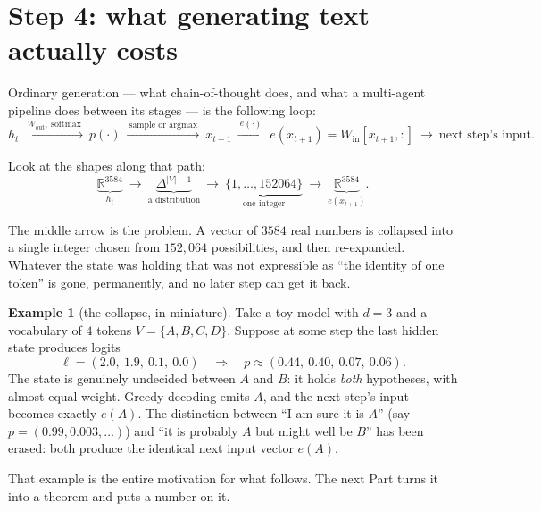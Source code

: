 \documentclass[11pt]{article}
\theoremstyle{definition}
\newtheorem{example}[theorem]{Example}
\begin{document}
\begin{center}
\end{center}

\section{Step 4: what generating text actually costs}
\label{sec:roundtrip}

Ordinary generation --- what chain-of-thought does, and what a multi-agent pipeline does between its stages --- is the following loop:
\[
h_t
\ \xrightarrow{\ W_{\mathrm{out}},\ \mathrm{softmax}\ }\ p(\cdot)
\ \xrightarrow{\ \text{sample or argmax}\ }\ x_{t+1}
\ \xrightarrow{\ e(\cdot)\ }\ e(x_{t+1}) = W_{\mathrm{in}}[x_{t+1},:]
\ \longrightarrow\ \text{next step's input}.
\tag{2.3}
\]

Look at the shapes along that path:
\[
\underbrace{\mathbb{R}^{3584}}_{h_t}
\ \longrightarrow\
\underbrace{\Delta^{|V|-1}}_{\text{a distribution}}
\ \longrightarrow\
\underbrace{\{1,\dots,152064\}}_{\text{one integer}}
\ \longrightarrow\
\underbrace{\mathbb{R}^{3584}}_{e(x_{t+1})}.
\]

The middle arrow is the problem. A vector of $3584$ real numbers is collapsed into a single integer chosen from $152{,}064$ possibilities, and then re-expanded. Whatever the state was holding that was not expressible as ``the identity of one token'' is gone, permanently, and no later step can get it back.

\begin{example}[the collapse, in miniature]
Take a toy model with $d = 3$ and a vocabulary of $4$ tokens $V=\{A,B,C,D\}$. Suppose at some step the last hidden state produces logits
\[
\ell = (2.0,\ 1.9,\ 0.1,\ 0.0)
\quad\Longrightarrow\quad
p \approx (0.44,\ 0.40,\ 0.07,\ 0.06).
\]
The state is genuinely undecided between $A$ and $B$: it holds \emph{both} hypotheses, with almost equal weight. Greedy decoding emits $A$, and the next step's input becomes exactly $e(A)$. The distinction between ``I am sure it is $A$'' (say $p = (0.99, 0.003,\dots)$) and ``it is probably $A$ but might well be $B$'' has been erased: both produce the identical next input vector $e(A)$.
\end{example}

That example is the entire motivation for what follows. The next Part turns it into a theorem and puts a number on it.
\end{document}
